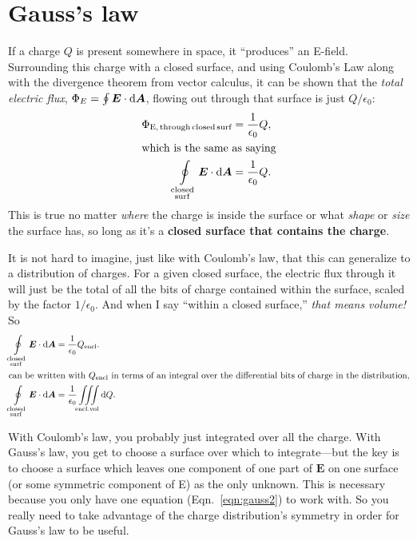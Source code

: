 \documentclass[10pt,letterpaper,twoside]{article}
\begin{document}
\section{Gauss's law}
If a charge $Q$ is present somewhere in space, it ``produces'' an E-field.
Surrounding this charge with a closed surface, and using Coulomb's Law along with the divergence theorem from vector calculus, it can be shown that the \textit{total electric flux}, $\Phi_E=\oint\bm E\cdot \text d \bm A$, flowing out through that surface is just $Q/\epsilon_0$:
\begin{align}
  \Phi_{\text{E,\,through\,closed\,surf}} &= \frac{1}{\epsilon_0}Q, \label{eqn:gauss_charge1}\\
  \intertext{which is the same as saying}
  \oint\limits_{\substack{\mathrm{closed}\\\mathrm{surf}}} \bm E\cdot \mathrm{d}\bm A &= \frac{1}{\epsilon_0}Q. \label{eqn:gauss_charge2}
\end{align}
This is true no matter \textit{where} the charge is inside the surface or what \textit{shape} or \textit{size} the surface has, so long as it's a \textbf{closed surface that contains the charge}.

It is not hard to imagine, just like with Coulomb's law, that this can generalize to a distribution of charges.
For a given closed surface, the electric flux through it will just be the total of all the bits of charge contained within the surface, scaled by the factor $1/\epsilon_0$.
And when I say ``within a closed surface,'' \textit{that means volume!}
So 
\begin{align}
  \oint\limits_{\substack{\mathrm{closed}\\\mathrm{surf}}} \bm E\cdot \mathrm{d}\bm A &= \frac{1}{\epsilon_0}Q_{\mathrm{encl}}. \label{eqn:gauss1}\\
  \intertext{can be written with $Q_\text{encl}$ in terms of an integral over the differential bits of charge in the distribution,}
  \oint\limits_{\substack{\mathrm{closed}\\\mathrm{surf}}} \bm E\cdot \mathrm{d}\bm A &= \frac{1}{\epsilon_0}\iiint\limits_\mathrm{encl. vol} \text d Q. \label{eqn:gauss2}
\end{align}

With Coulomb's law, you probably just integrated over all the charge.
With Gauss's law, you get to choose a surface over which to integrate---but the key is to choose a surface which leaves one component of one part of $\bm E$ on one surface (or some symmetric component of E) as the only unknown.
This is necessary because you only have one equation (Eqn.~\ref{eqn:gauss2}) to work with.
So you really need to take advantage of the charge distribution's symmetry in order for Gauss's law to be useful.
\end{document}
